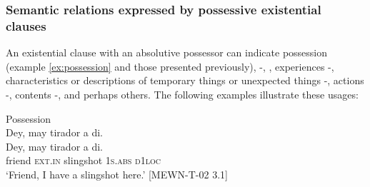 \subsubsection{Semantic relations expressed by possessive existential clauses}

An existential clause with an absolutive possessor can indicate possession (example \ref{ex:possession} and those presented previously),  -,  , experiences -, characteristics or descriptions of temporary things or unexpected things -, actions -, contents -, and perhaps others. The following examples illustrate these usages:

\ea
\label{ex:possession}
Possession \\
Dey,  may  tirador  a  di. \\\smallskip \gll Dey,  may  tirador  a  di. \\
friend  \textsc{ext.in}  slingshot  1\textsc{s.abs}  \textsc{d1loc} \\
\glt ‘Friend, I have a slingshot here.’ [MEWN-T-02 3.1]
\z


